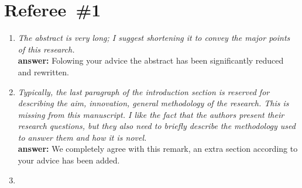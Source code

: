 \documentclass[final,3p]{elsarticle}
\begin{document}
\section*{Referee~\#1}

\begin{enumerate}
\item {\it    The abstract is very long; I suggest shortening it to convey the major points of this research.} \\
{\bf answer:} Folowing your advice  the abstract has been significantly reduced and rewritten.

\item {\it Typically, the last paragraph of the introduction section is reserved for describing the aim, innovation, general methodology of the research. This is missing from this manuscript. I like the fact that the authors present their research questions, but they also need to briefly describe the methodology used to answer them and how it is novel.} \\ 
{\bf  answer:} We completely agree with this remark, an extra section according to your advice has been added.

\item 

\end{enumerate}
\end{document}
